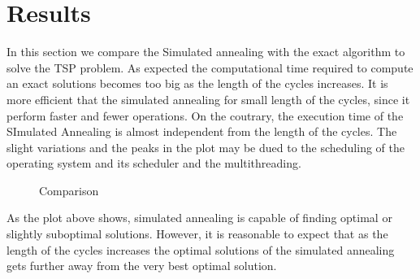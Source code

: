 \documentclass{article}
\begin{document}
\section{Results}
In this section we compare the Simulated annealing with the exact algorithm to solve the TSP problem. As expected the computational time required to compute an exact solutions becomes too big as the length of the cycles increases. It is more efficient that the simulated annealing for small length of the cycles, since it perform faster and fewer operations. On the coutrary, the execution time of the SImulated Annealing is almost independent from the length of the cycles. The slight variations and the peaks in the plot may be dued to the scheduling of the operating system and its scheduler and the multithreading.
\begin{figure}[H]
\begin{adjustwidth}{-4em}{-4em}

     \hfill
     
     \caption{Comparison}
    \end{adjustwidth}
   \end{figure}
\noindent As the plot above shows, simulated annealing is capable of finding optimal or slightly suboptimal solutions. However, it is reasonable to expect that as the length of the cycles increases the optimal solutions of the simulated annealing gets further away from the very best optimal solution.\\
\end{document}

